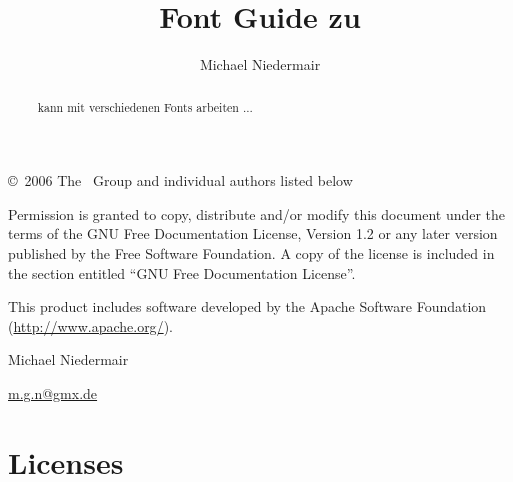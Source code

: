 \documentclass{extex-doc}
\begin{document}

\begin{titlepage}\parindent=0pt

  \title{Font Guide zu \ExTeX}
  \author{Michael Niedermair}
  \maketitle

  \begin{center}
    \begin{abstract}\parindent=0pt
      \ExTeX\ kann mit verschiedenen Fonts arbeiten ...

    \end{abstract}
  \end{center}
  \newpage
  \footnotesize
  \copyright\ 2006 The \ExTeX\ Group and individual authors listed below
  \medskip

Permission is granted to copy, distribute and/or modify this document
under the terms of the GNU Free Documentation License, Version 1.2 or
any later version published by the Free Software Foundation. A copy of
the license is included in the section entitled ``GNU Free
Documentation License''.
\bigskip

This product includes software developed by the Apache Software
Foundation (\url{http://www.apache.org/}).

\vfill

Michael Niedermair
\smallskip

\href{mailto://m.g.n@gmx.de}{m.g.n@gmx.de}
\end{titlepage}

\tableofcontents
\newpage




\appendix
\chapter{Licenses}


\printindex
\end{document}
